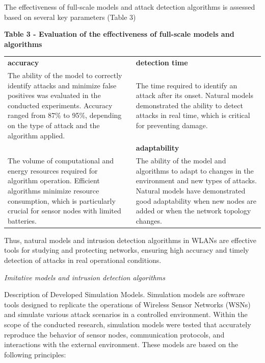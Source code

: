 The effectiveness of full-scale models and attack detection algorithms
is assessed based on several key parameters (Table 3)

{\bfseries Table 3 - Evaluation of the effectiveness of full-scale models
and algorithms}

\begin{longtable}[]{@{}
  >{\raggedright\arraybackslash}p{}
  >{\raggedright\arraybackslash}p{}@{}}
\toprule\noalign{}
\endhead
\bottomrule\noalign{}
\endlastfoot
{\bfseries accuracy} & {\bfseries detection time} \\
The ability of the model to correctly identify attacks and minimize
false positives was evaluated in the conducted experiments. Accuracy
ranged from 87\% to 95\%, depending on the type of attack and the
algorithm applied. & The time required to identify an attack after its
onset. Natural models demonstrated the ability to detect attacks in real
time, which is critical for preventing damage. \\
{\bfseries resource consumption} & {\bfseries adaptability} \\
The volume of computational and energy resources required for algorithm
operation. Efficient algorithms minimize resource consumption, which is
particularly crucial for sensor nodes with limited batteries. & The
ability of the model and algorithms to adapt to changes in the
environment and new types of attacks. Natural models have demonstrated
good adaptability when new nodes are added or when the network topology
changes. \\
\end{longtable}

Thus, natural models and intrusion detection algorithms in WLANs are
effective tools for studying and protecting networks, ensuring high
accuracy and timely detection of attacks in real operational conditions.

\emph{Imitative models and intrusion detection algorithms}

Description of Developed Simulation Models. Simulation models are
software tools designed to replicate the operations of Wireless Sensor
Networks (WSNs) and simulate various attack scenarios in a controlled
environment. Within the scope of the conducted research, simulation
models were tested that accurately reproduce the behavior of sensor
nodes, communication protocols, and interactions with the external
environment. These models are based on the following principles:


